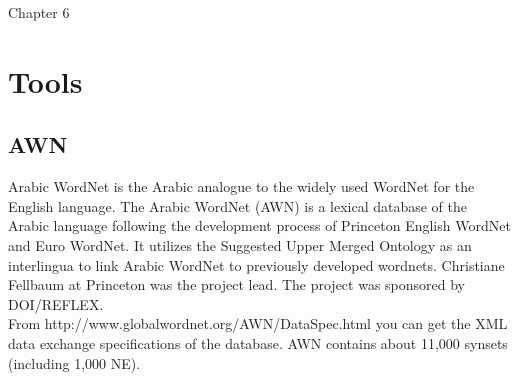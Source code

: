Chapter 6

\chapter{Tools} %

\label{Chapter6} %



\section{AWN}
Arabic WordNet is the Arabic analogue to the widely used WordNet for the English language. The Arabic WordNet (AWN) is a lexical database of the Arabic language following the development process of Princeton English WordNet and Euro WordNet. It utilizes the Suggested Upper Merged Ontology as an interlingua to link Arabic WordNet to previously developed wordnets. Christiane Fellbaum at Princeton was the project lead. The project was sponsored by DOI/REFLEX.\\
From http://www.globalwordnet.org/AWN/DataSpec.html you can get the XML data exchange specifications of the database. AWN contains about 11,000 synsets (including 1,000 NE).\\

